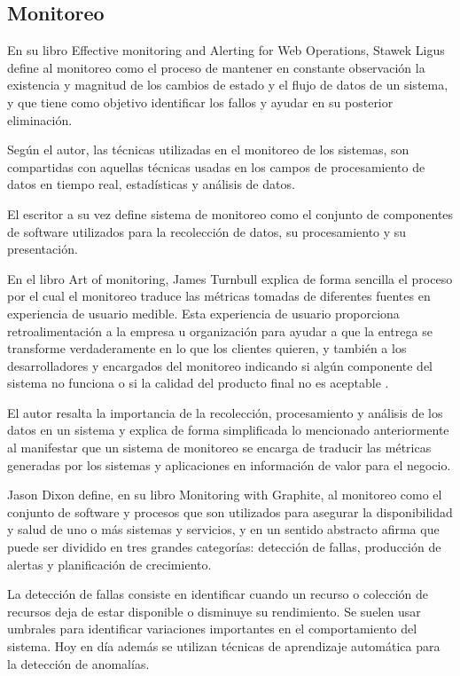 \subsection{Monitoreo}
\label{monitoreo}

En su libro Effective monitoring and Alerting for Web Operations, Stawek Ligus
define al monitoreo como el proceso de mantener en constante observación la
existencia y magnitud de los cambios de estado y el flujo de datos de un
sistema, y que tiene como objetivo identificar los fallos y ayudar en su
posterior eliminación\cite[p.~2]{monitoreo:efective_monitoring_and_alerting}.

Según el autor, las técnicas utilizadas en el monitoreo de los sistemas, son
compartidas con aquellas técnicas usadas en los campos de procesamiento de
datos en tiempo real, estadísticas y análisis de datos.

El escritor a su vez define sistema de monitoreo como el conjunto de
componentes de software utilizados para la recolección de datos, su
procesamiento y su presentación.

En el libro Art of monitoring, James Turnbull explica de forma sencilla el
proceso por el cual el monitoreo traduce las métricas tomadas de diferentes
fuentes en experiencia de usuario medible. Esta experiencia de usuario
proporciona retroalimentación a la empresa u organización para ayudar a que la
entrega se transforme verdaderamente en lo que los clientes quieren, y también
a los desarrolladores y encargados del monitoreo indicando si algún componente
del sistema no funciona o si la calidad del producto final no es aceptable
\cite[p.~8]{monitoreo:art_of_monitoring}.

El autor resalta la importancia de la recolección, procesamiento y análisis de
los datos en un sistema y explica de forma simplificada lo mencionado
anteriormente al manifestar que un sistema de monitoreo se encarga de traducir
las métricas generadas por los sistemas y aplicaciones en información de valor
para el negocio.

Jason Dixon define, en su libro Monitoring with Graphite, al monitoreo como el
conjunto de software y procesos que son utilizados para asegurar la
disponibilidad y salud de uno o más sistemas y servicios, y en un sentido
abstracto afirma que puede ser dividido en tres grandes categorías: detección
de fallas, producción de alertas y planificación de crecimiento.

La detección de fallas consiste en identificar cuando un recurso o colección de
recursos deja de estar disponible o disminuye su rendimiento. Se suelen usar
umbrales para identificar variaciones importantes en el comportamiento del
sistema. Hoy en día además se utilizan técnicas de aprendizaje automática para
la detección de anomalías.

